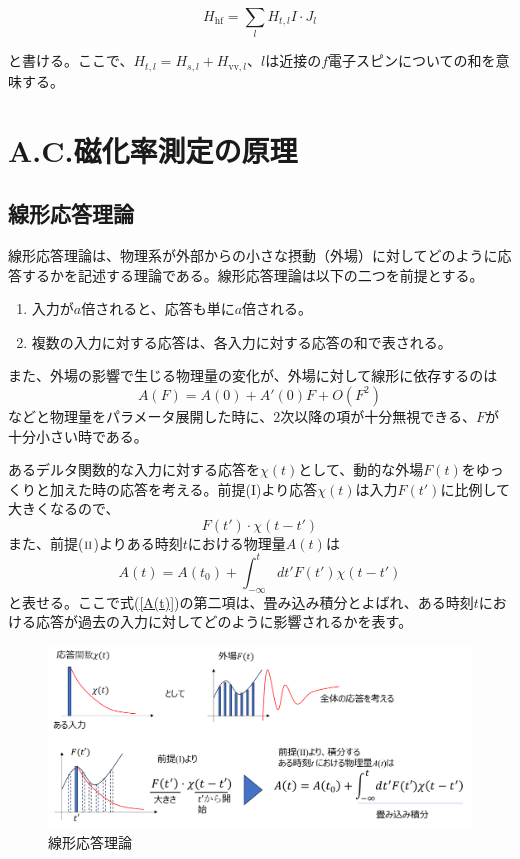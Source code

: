\documentclass[11pt,a4j]{jreport}
\begin{document}
\begin{equation}
H_{\text{hf}} = \sum_{l} H_{t, l} I \cdot J_l
\end{equation}

と書ける。ここで、$H_{t, l} = H_{s, l} + H_{\text{vv}, l}$、$l$は近接の$f$電子スピンについての和を意味する。

\chapter{A.C.磁化率測定の原理}
\section{線形応答理論}
線形応答理論は、物理系が外部からの小さな摂動（外場）に対してどのように応答するかを記述する理論である。線形応答理論は以下の二つを前提とする。
\begin{enumerate}[label=\textnormal{(\Roman*)}]
  \item 入力が$a$倍されると、応答も単に$a$倍される。
  \item 複数の入力に対する応答は、各入力に対する応答の和で表される。
\end{enumerate}
また、外場の影響で生じる物理量の変化が、外場に対して線形に依存するのは
\begin{equation}
  A(F)=A(0)+A'(0)F+O(F^2)
\end{equation}
などと物理量をパラメータ展開した時に、2次以降の項が十分無視できる、$F$が十分小さい時である。\par
あるデルタ関数的な入力に対する応答を$\chi(t)$として、動的な外場$F(t)$をゆっくりと加えた時の応答を考える。前提(I)より応答$\chi(t)$は入力$F(t')$に比例して大きくなるので、
\begin{equation}
  F(t')\cdot\chi(t-t')
\end{equation}
また、前提($\textsc{ii}$)よりある時刻$t$における物理量$A(t)$は
\begin{equation}
 A(t)=A(t_0)+\int_{-\infty}^{t}{dt'F(t') \chi(t-t')}
 \label{A(t)}
\end{equation}
と表せる。ここで式(\ref{A(t)})の第二項は、畳み込み積分とよばれ、ある時刻$t$における応答が過去の入力に対してどのように影響されるかを表す。
\begin{figure}[htbp]
  \centering
  \vspace{10mm}
  \includegraphics[width=160mm]{./figure/liner_theory.png}
  \caption{線形応答理論}
  \label{liner_theroy}
\end{figure}
\end{document}
